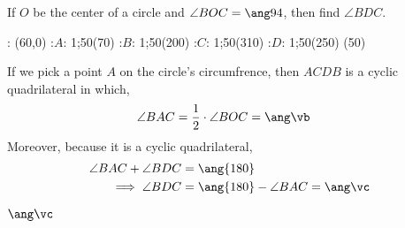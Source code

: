 

\DIVIDE{}\vb
{}\vb\vc

\question[2]  If $O$ be the center of a circle and $\angle BOC = \ang\va$, then 
find $\angle BDC$.

\watchout

  : (60,0)
  :$A$: 1;50(70)
  :$B$: 1;50(200)
  :$C$: 1;50(310)
  :$D$: 1;50(250)
\figdrawbegin{}
(50)
  \figdrawline [3,1,4,5,3]
  \ifprintanswers
    \figdrawline [3,2,4]
  \fi
\figdrawend
{}

\vspace{1cm}
\centerline{\box\figBoxA}

\begin{solution}[\halfpage]
	If we pick a point $A$ on the circle's circumfrence, then $ACDB$ is a cyclic 
	quadrilateral in which,
	\begin{align}
		\angle BAC &= \dfrac{1}{2}\cdot\angle BOC = \ang\vb
	\end{align}
	Moreover, because it is a cyclic quadrilateral, 
	\begin{align}
		\angle BAC + \angle BDC &= \ang{180} \\
		\implies \angle BDC &= \ang{180} - \angle BAC = \ang\vc
	\end{align}
\end{solution}
\ifprintanswers\begin{codex}$\ang\vc$\end{codex}\fi
